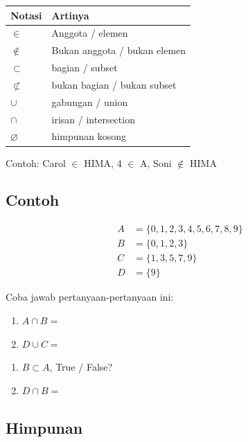 \documentclass[
  letterpaper,
  DIV=11,
  numbers=noendperiod]{scrartcl}
\providecommand{\tightlist}{%
  \setlength{\itemsep}{0pt}\setlength{\parskip}{0pt}}\usepackage{longtable,booktabs,array}
\begin{document}
\begin{longtable}[]{@{}ll@{}}
\toprule\noalign{}
Notasi & Artinya \\
\midrule\noalign{}
\endhead
\bottomrule\noalign{}
\endlastfoot
\(\in\) & Anggota / elemen \\
\(\not \in\) & Bukan anggota / bukan elemen \\
\(\subset\) & bagian / subset \\
\(\not \subset\) & bukan bagian / bukan subset \\
\(\cup\) & gabungan / union \\
\(\cap\) & irisan / intersection \\
\(\varnothing\) & himpunan kosong \\
\end{longtable}

Contoh: Carol \(\in\) HIMA, 4 \(\in\) A, Soni \(\not \in\) HIMA

\hypertarget{contoh-1}{%
\subsection{Contoh}\label{contoh-1}}

\[
\begin{align}
A&=\{0,1,2,3,4,5,6,7,8,9\} \\
B&=\{0,1,2,3\} \\
C&=\{1,3,5,7,9\} \\
D&=\{9\}
\end{align}
\]

Coba jawab pertanyaan-pertanyaan ini:

\begin{enumerate}
\def\labelenumi{\arabic{enumi}.}
\tightlist
\item
  \(A \cap B=\)
\item
  \(D \cup C=\)
\end{enumerate}

\begin{enumerate}
\def\labelenumi{\arabic{enumi}.}
\setcounter{enumi}{2}
\tightlist
\item
  \(B \subset A\), True / False?
\item
  \(D \cap B=\)
\end{enumerate}

\hypertarget{himpunan-1}{%
\subsection{Himpunan}\label{himpunan-1}}
\end{document}
